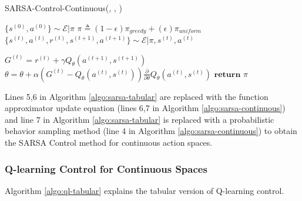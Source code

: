 \documentclass[11pt]{article}
\begin{document}
\begin{algorithm}[H]
\caption{SARSA-Control-Continuous(\pi, \epsilon, \alpha)}
\label{algo:sarsa-continuous}
\begin{algorithmic}[1]
\vspace{0.15cm}
\STATE $\{s^{(0)}, a^{(0)}\} \sim \mathcal{E}|\pi$
\vspace{0.15cm}
\vspace{0.15cm}
\STATE $\pi \triangleq (1-\epsilon) \pi_{greedy} + (\epsilon)  \pi_{uniform}$
\vspace{0.15cm}
\STATE $\{s^{(t)}, a^{(t)}, r^{(t)}, s^{(t+1)}, a^{(t+1)}\} \sim \mathcal{E}|\pi, s^{(t)}, a^{(t)}$
\vspace{0.15cm}

\STATE $G^{(t)} = r^{(t)} + \gamma Q_{\theta}(a^{(t+1)}, s^{(t+1)})$\\
\vspace{0.15cm}
\STATE $\theta = \theta + \alpha \left( G^{(t)} - Q_{\theta}(a^{(t)}, s^{(t)})\right)\frac{\partial}{\partial \theta}Q_{\theta}(a^{(t)}, s^{(t)})$
\vspace{0.15cm}
\ENDFOR
\ENDFOR
\STATE $\textbf{return } \pi$
\end{algorithmic}
\end{algorithm}


Lines 5,6 in Algorithm \ref{algo:sarsa-tabular} are replaced with the function approximator update equation (lines 6,7 in Algorithm \ref{algo:sarsa-continuous}) and line 7 in Algorithm \ref{algo:sarsa-tabular} is replaced with a probabilistic behavior sampling method (line 4 in Algorithm \ref{algo:sarsa-continuous}) to obtain the SARSA Control method for continuous action spaces.

\subsubsection{Q-learning Control for Continuous Spaces}

Algorithm \ref{algo:ql-tabular} explains the tabular version of Q-learning control.
\end{document}
